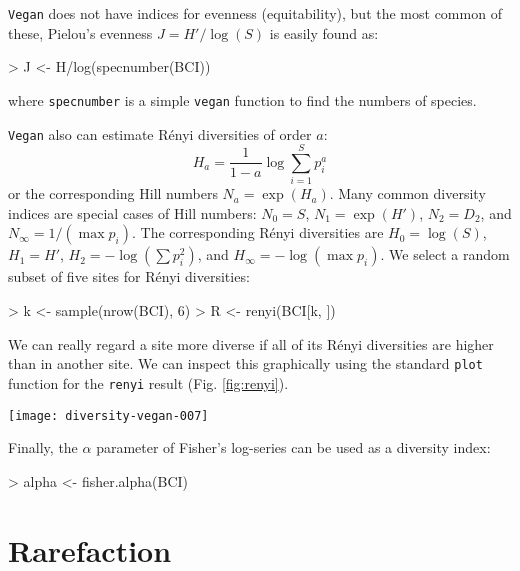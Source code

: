 \documentclass[a4paper,10pt]{amsart}
\begin{document}
\texttt{Vegan} does not have indices for evenness (equitability), but
the most common of these, Pielou's evenness $J = H'/\log(S)$ is easily
found as:
\begin{Schunk}
\begin{Sinput}
> J <- H/log(specnumber(BCI))
\end{Sinput}
\end{Schunk}
where \texttt{specnumber} is a simple \texttt{vegan} function to find
the numbers of species.

\texttt{Vegan} also can estimate R\'{e}nyi diversities of order $a$:
\begin{equation}
H_a = \frac{1}{1-a} \log \sum_{i=1}^S p_i^a
\end{equation}
or the corresponding Hill numbers $N_a = \exp(H_a)$.  Many common
diversity indices are special cases of Hill numbers: $N_0 = S$, $N_1 =
\exp(H')$, $N_2 = D_2$, and $N_\infty = 1/(\max p_i)$. The
corresponding R\'{e}nyi diversities are $H_0 = \log(S)$, $H_1 = H'$, $H_2 =
- \log(\sum p_i^2)$, and $H_\infty = - \log(\max p_i)$.  We select a
random subset of five sites for R\'{e}nyi diversities:
\begin{Schunk}
\begin{Sinput}
> k <- sample(nrow(BCI), 6)
> R <- renyi(BCI[k, ])
\end{Sinput}
\end{Schunk}
We can really regard a site more diverse if all of its R\'{e}nyi
diversities are higher than in another site.  We can inspect this
graphically using the standard \texttt{plot} function for the
\texttt{renyi} result (Fig. \ref{fig:renyi}).
\begin{SCfigure}
\texttt{[image: diversity-vegan-007]}
\caption{R\'{e}nyi diversities in six randomly selected plots. The plot
  uses Trellis graphics with a separate panel for each site. The dots
  show the values for sites, and the lines the extremes and median in
  the data set.}
\label{fig:renyi}
\end{SCfigure}

Finally, the $\alpha$ parameter of Fisher's log-series can be used as
a diversity index:
\begin{Schunk}
\begin{Sinput}
> alpha <- fisher.alpha(BCI)
\end{Sinput}
\end{Schunk}

\section{Rarefaction}
\end{document}
